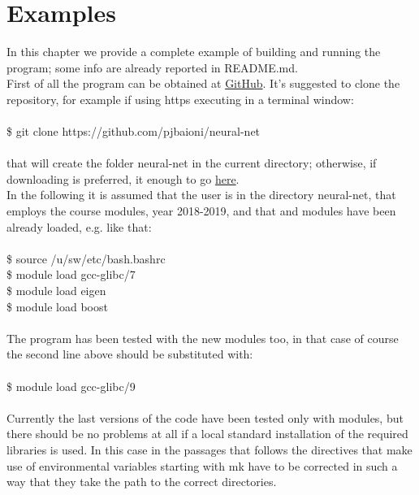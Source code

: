 \documentclass[12pt, a4paper]{report}
\theoremstyle{definition}
\begin{document}
\chapter{Examples}\label{chapter4}
\setcounter{figure}{11}
In this chapter we provide a complete example of building and running the program; some info are already reported in README.md.\\
First of all the program can be obtained at \href{https://github.com/pjbaioni/neural-net}{GitHub}. It's suggested to clone the repository, for example if using https executing in a terminal window:\\
{\\ \ttfamily 
	\$ git clone https://github.com/pjbaioni/neural-net\\
\\}
that will create the folder neural-net in the current directory; otherwise, if downloading is preferred, it enough to go \href{https://github.com/pjbaioni/neural-net/archive/master.zip}{here}.\\
In the following it is assumed that the user is in the directory neural-net, that employs the \cite{pacs} course modules, year 2018-2019, and that \cite{eigen} and \cite{boost} modules have been already loaded, e.g. like that:\\
{\\ \ttfamily 
	\$ source /u/sw/etc/bash.bashrc\\
	\$ module load gcc-glibc/7\\
	\$ module load eigen\\
	\$ module load boost\\
	\\}
The program has been tested with the new modules too, in that case of course the second line above should be substituted with:\\
{\\ \ttfamily 
	\$ module load gcc-glibc/9\\
	\\}
Currently the last versions of the code have been tested only with modules, but there should be no problems at all if a local standard installation of the required libraries is used. In this case in the passages that follows the directives that make use of environmental variables starting with {\ttfamily mk} have to be corrected in such a way that they take the path to the correct directories.
\newpage
\end{document}

